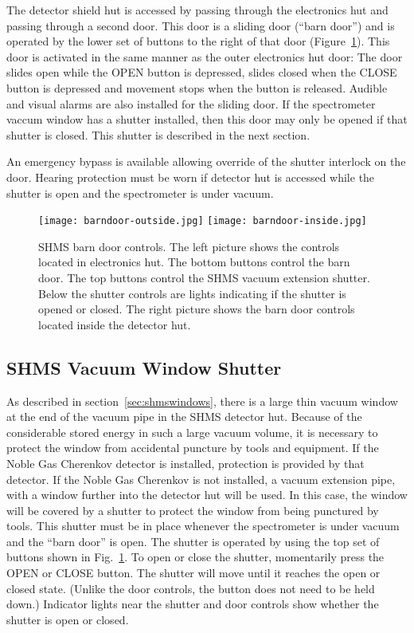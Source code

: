 {The detector shield hut is accessed by passing through the electronics
hut and passing through a second door.  This door is a sliding door
(``barn door'') and is operated by the lower set of buttons to the
right of that door (Figure~\ref{fig:barndoorcontrol}).  This door is activated
in the same manner as the outer electronics hut door: The door slides open
while the OPEN button is depressed, slides closed when the CLOSE button
is depressed and movement stops when the button is released.  Audible and
visual alarms are also installed for the sliding door.
If the spectrometer
vaccum window has a shutter installed, then this door may only be
opened if that shutter is closed.  This shutter is described in the
next section.

An emergency bypass is available allowing override of the shutter
interlock on the door.  Hearing protection must be worn if detector
hut is accessed while the shutter is open and the spectrometer is
under vacuum.

\begin{figure}
\begin{center}
\texttt{[image: barndoor-outside.jpg]}
\texttt{[image: barndoor-inside.jpg]}
\caption{\label{fig:barndoorcontrol}SHMS barn door controls.  The left
  picture shows the controls located in electronics hut.  The bottom
  buttons control the barn door. The top buttons control the SHMS
  vacuum extension shutter.  Below the shutter controls are lights
  indicating if the shutter is opened or closed.  The right picture
  shows the barn door controls located inside the detector hut.}
\end{center}
\end{figure}

\subsection{SHMS Vacuum Window Shutter}
\label{sec:shmsshutter}
As described in section~\ref{sec:shmswindows}, there is a large thin
vacuum window at the end of the vacuum pipe in the SHMS detector hut.
Because of
the considerable stored energy in such a large vacuum volume, it is
necessary to protect the window from accidental puncture by
tools and equipment.
If
the Noble Gas Cherenkov detector is installed, protection is provided
by that detector.
If the Noble Gas Cherenkov is not installed, a vacuum
extension pipe, with a window further into the detector hut will be
used.  In this case, the window will be covered by a shutter to
protect the window from being punctured by tools.
This shutter must be in place whenever the spectrometer is under vacuum and
the ``barn door'' is open.  The shutter is operated by using the top
set of buttons shown in Fig.~\ref{fig:barndoorcontrol}.  To open or close
the shutter, momentarily press the OPEN or CLOSE button.  The shutter will move
until it reaches the open or closed state. (Unlike the door controls,
the button does not need to be held down.)  Indicator
lights near the shutter and door controls show whether the shutter is open or closed.




}%
